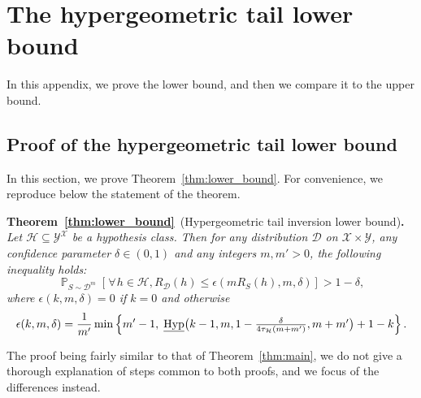 \documentclass[twoside,11pt]{article}
\let\oldforall=\forall
\renewcommand{\forall}{\hspace{1pt}\oldforall\hspace{1pt}}
\newcommand{\cb}[1]{\left\{#1\right\}}
\newcommand{\D}{\mathcal{D}}
\renewcommand{\H}{{\mathcal{H}}}
\DeclareMathOperator*{\Prob}{\mathds{P}}
\newcommand{\prob}[2]{\Prob_{#1}\left[#2\right]}
\newcommand{\HypInvLower}{\underline{\textnormal{Hyp}}}
\begin{document}
\clearpage
\section{The hypergeometric tail lower bound}
\label{app:lower_bound}

In this appendix, we prove the lower bound, and then we compare it to the upper bound.




\subsection{Proof of the hypergeometric tail lower bound}
\label{app:proof_lower_bound}

In this section, we prove Theorem~\ref{thm:lower_bound}.
For convenience, we reproduce below the statement of the theorem.

\noindent\textbf{Theorem~\ref{thm:lower_bound}}~(Hypergeometric tail inversion lower bound)\textbf{.}
\textit{
Let $\H \subseteq \mathcal{Y}^\mathcal{X}$ be a hypothesis class.
Then for any distribution $\D$ on $\mathcal{X} \times \mathcal{Y}$, any confidence parameter $\delta \in (0, 1)$ and any integers $m, m'>0$, the following inequality holds:
\begin{equation*}
\prob{S\sim\D^m}{\forall h \in \H, R_\D(h) \leq \epsilon(m R_S(h), m, \delta)} > 1 - \delta,
\end{equation*}
where $\epsilon(k,m,\delta) = 0$ if $k=0$ and otherwise
\begin{equation*}
\epsilon(k, m, \delta) = \frac{1}{m'} \min\cb{ m'-1,\; \HypInvLower\big(k-1, m, 1- \textstyle\frac{\delta}{4 \tau_\H(m + m')}, m + m'\big) + 1 - k }.
\end{equation*}
}

The proof being fairly similar to that of Theorem~\ref{thm:main}, we do not give a thorough explanation of steps common to both proofs, and we focus of the differences instead.
\end{document}
